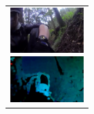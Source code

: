 \documentclass[MIRU,submit,english]{miru2019e}
\begin{document}
\begin{figure}[tb]
    \begin{tabular}{l}

      \begin{minipage}{0.32\hsize}
        \begin{center}
          \includegraphics[clip, width=2.8cm]{./Figures/still_seevictim3.eps}
        \end{center}
      \end{minipage}

      \begin{minipage}{0.32\hsize}
        \begin{center}
          \includegraphics[clip, width=2.8cm]{./Figures/optic_seevictim3.eps}
        \end{center}
      \end{minipage}


\end{tabular}
\end{figure}
\end{document}
